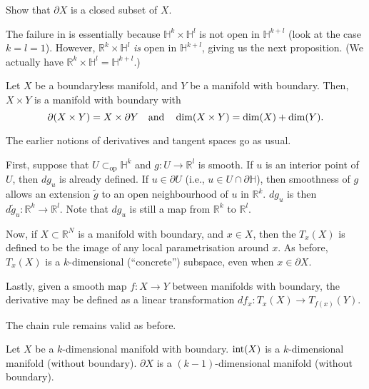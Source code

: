 \documentclass[12pt]{article}
\newcommand{\opsub}{\subset_{\operatorname{op}}}
\begin{document}
\begin{exe}
	Show that $\partial X$ is a closed subset of $X$.
\end{exe}

The failure in  is essentially because $\mathbb{H}^{k} \times \mathbb{H}^{l}$ is not open in $\mathbb{H}^{k + l}$ (look at the case $k = l = 1$). However, $\mathbb{R}^{k} \times \mathbb{H}^{l}$ \emph{is} open in $\mathbb{H}^{k + l}$, giving us the next proposition. (We actually have $\mathbb{R}^{k} \times \mathbb{H}^{l} = \mathbb{H}^{k + l}$.)

\begin{prop}
	Let $X$ be a boundaryless manifold, and $Y$ be a manifold with boundary. \newline
	Then, $X \times Y$ is a manifold with boundary with
	\begin{equation*} 
		\partial(X \times Y) = X \times \partial Y \quad\text{and}\quad \dim(X \times Y) = \dim(X) + \dim(Y).
	\end{equation*}
\end{prop}

The earlier notions of derivatives and tangent spaces go as usual.

First, suppose that $U \opsub \mathbb{H}^{k}$ and $g : U \to \mathbb{R}^{l}$ is smooth. If $u$ is an interior point of $U$, then $dg_{u}$ is already defined. If $u \in \partial U$ (i.e., $u \in U \cap \partial \mathbb{H}$), then smoothness of $g$ allows an extension $\widetilde{g}$ to an open neighbourhood of $u$ in $\mathbb{R}^{k}$. $dg_{u}$ is then $d\widetilde{g}_{u} : \mathbb{R}^{k} \to \mathbb{R}^{l}$. \newline
Note that $dg_{u}$ is still a map from $\mathbb{R}^{k}$ to $\mathbb{R}^{l}$.

Now, if $X \subset \mathbb{R}^{N}$ is a manifold with boundary, and $x \in X$, then the  $T_{x}(X)$ is defined to be the image of any local parametrisation around $x$. As before, $T_{x}(X)$ is a $k$-dimensional (``concrete'') subspace, even when $x \in \partial X$. 

Lastly, given a smooth map $f : X \to Y$ between manifolds with boundary, the derivative may be defined as a linear transformation $df_{x} : T_{x}(X) \to T_{f(x)}(Y)$.

The chain rule remains valid as before.

\begin{prop}
	Let $X$ be a $k$-dimensional manifold with boundary. \newline
	$\operatorname{int}(X)$ is a $k$-dimensional manifold (without boundary). \newline
	$\partial X$ is a $(k - 1)$-dimensional manifold (without boundary).
\end{prop}
\end{document}
